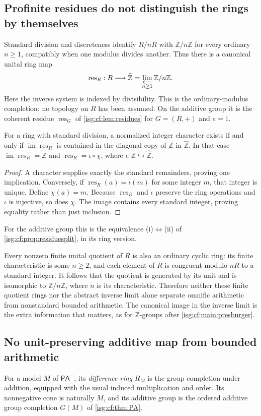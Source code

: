 \documentclass[11pt]{article}
\theoremstyle{definition}
\theoremstyle{remark}
\newcommand{\Z}{\mathbb{Z}}
\newcommand{\Zhat}{\widehat{\Z}}
\newcommand{\res}{\operatorname{res}}
\newcommand{\PAminus}{\mathsf{PA}^{-}}
\newcommand{\im}{\operatorname{im}}
\begin{document}
\subsection{Profinite residues do not distinguish the rings by themselves}\label{isg:sc:sec:residues}
Standard division and discreteness identify $R/nR$ with $\Z/n\Z$ for every
ordinary $n\ge1$, compatibly when one modulus divides another. Thus there
is a canonical unital ring map
\[
 \res_R:R\longrightarrow\Zhat=\varprojlim_{n\ge1}\Z/n\Z.
\]
Here the inverse system is indexed by divisibility. This is the
ordinary-modulus completion; no topology on $R$ has been assumed. On the
additive group it is the coherent residue $\res_G$ of
\cref{isg:cf:lem:residues} for $G=(R,+)$ and $e=1$.

\begin{proposition}\label{isg:sc:prop:diagonal}
For a ring with standard division, a normalized integer character exists
if and only if $\im\res_R$ is contained in the diagonal copy of $\Z$ in
$\Zhat$. In that case $\im\res_R=\Z$ and $\res_R=\iota\circ\chi$, where
$\iota:\Z\hookrightarrow\Zhat$.
\end{proposition}
\begin{proof}
A character supplies exactly the standard remainders, proving one
implication. Conversely, if $\res_R(a)=\iota(m)$ for some integer $m$,
that integer is unique. Define $\chi(a)=m$. Because $\res_R$ and $\iota$
preserve the ring operations and $\iota$ is injective, so does $\chi$. The
image contains every standard integer, proving equality rather than just
inclusion.
\end{proof}
For the additive group this is the equivalence (i)$\Leftrightarrow$(ii)
of \cref{isg:cf:prop:residuesplit}, in its ring version.

Every nonzero finite unital quotient of $R$ is also an ordinary cyclic
ring: its finite characteristic is some $n\ge2$, and each element of $R$
is congruent modulo $nR$ to a standard integer. It follows that the
quotient is generated by its unit and is isomorphic to $\Z/n\Z$, where $n$
is its characteristic. Therefore neither these finite quotient rings nor
the abstract inverse limit alone separate omnific arithmetic from
nonstandard bounded arithmetic. The canonical image in the inverse limit
is the extra information that matters, as for $\Z$-groups after
\cref{isg:cf:main:presburger}.

\subsection{No unit-preserving additive map from bounded arithmetic}\label{isg:sc:sec:nogo}
For a model $M$ of $\PAminus$, its \emph{difference ring} $R_M$ is the
group completion under addition, equipped with the usual induced
multiplication and order. Its nonnegative cone is naturally $M$, and its
additive group is the ordered additive group completion $G(M)$ of
\cref{isg:cf:thm:PA}.
\end{document}
